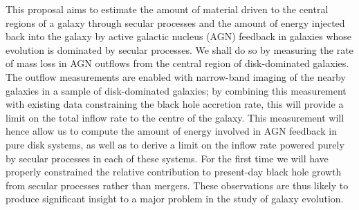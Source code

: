 \documentclass[12pt]{article}
\begin{document}
\newpage
{}
\vspace{0.25em}
This proposal aims to estimate the amount of material driven to the central regions of a galaxy through secular processes and the amount of energy injected back into the galaxy by active galactic nucleus (AGN) feedback in galaxies whose evolution is dominated by secular processes. We shall do so by measuring the rate of mass loss in AGN outflows from the central region of disk-dominated galaxies. The outflow measurements are enabled with narrow-band imaging of the nearby galaxies in a sample of disk-dominated galaxies; by combining this measurement with existing data constraining the black hole accretion rate, this will provide a limit on the total inflow rate to the centre of the galaxy. This measurement will hence allow us to compute the amount of energy involved in AGN feedback in pure disk systems, as well as to derive a limit on the inflow rate powered purely by secular processes in each of these systems. For the first time we will have properly constrained the relative contribution to present-day black hole growth from secular processes rather than mergers. These observations are thus likely to produce significant insight to a major problem in the study of galaxy evolution.
\end{document}

